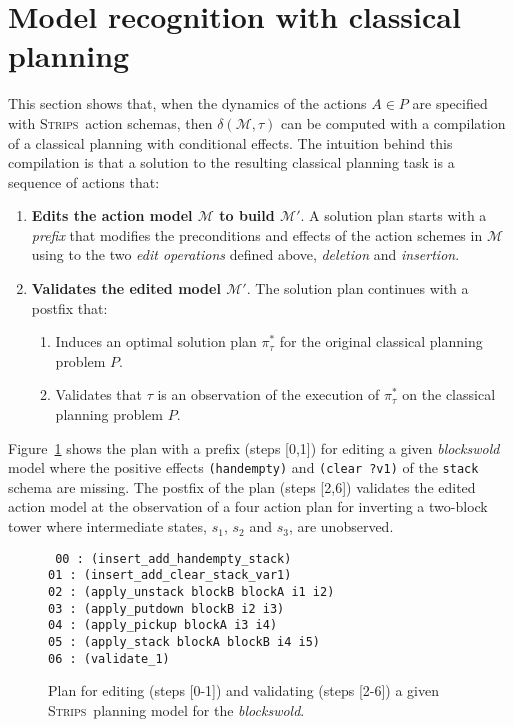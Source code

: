 \documentclass[letterpaper]{article} %
\newcommand{\strips}{\textsc{Strips}}     %
\begin{document}
\section{Model recognition with classical planning}
This section shows that, when the dynamics of the actions $A\in P$ are specified with \strips\ action schemas, then $\delta(\mathcal{M},\tau)$ can be computed with a compilation of a classical planning with conditional effects. The intuition behind this compilation is that a solution to the resulting classical planning task is a sequence of actions that:
\begin{enumerate}
\item {\bf Edits the action model $\mathcal{M}$ to build $\mathcal{M}'$}. A solution plan starts with a {\em prefix} that modifies the preconditions and effects of the action schemes in $\mathcal{M}$ using to the two {\em edit operations} defined above, {\em deletion} and {\em insertion}. 
\item {\bf Validates the edited model $\mathcal{M}'$}. The solution plan continues with a postfix that:
\begin{enumerate}
\item Induces an optimal solution plan $\pi^*_\tau$ for the original classical planning problem $P$.
\item Validates that $\tau$ is an observation of the execution of $\pi^*_\tau$ on the classical planning problem $P$.
\end{enumerate}
\end{enumerate}

Figure~\ref{fig:plan-pdistance} shows the plan with a prefix (steps [0,1]) for editing a given {\em blockswold} model where the positive effects {\tt\small (handempty)} and {\tt\small (clear ?v1)} of the {\tt\small stack} schema are missing. The postfix of the plan (steps [2,6]) validates the edited action model at the observation of a four action plan for inverting a two-block tower where intermediate states, $s_1$, $s_2$ and $s_3$, are unobserved. 
\begin{figure}
{\tt\scriptsize
00 : (insert\_add\_handempty\_stack)\\
01 : (insert\_add\_clear\_stack\_var1)\\
02 : (apply\_unstack blockB blockA i1 i2)\\
03 : (apply\_putdown blockB i2 i3)\\
04 : (apply\_pickup blockA i3 i4)\\
05 : (apply\_stack blockA blockB i4 i5)\\
06 : (validate\_1)
}
 \caption{\small Plan for editing (steps [0-1]) and validating (steps [2-6]) a given \strips\ planning model for the {\em blockswold}.}
\label{fig:plan-pdistance}
\end{figure}
\end{document}
